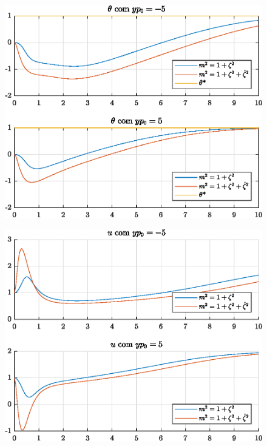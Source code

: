 \begin{figure}[H]
  \centering
  \includegraphics[width=12cm]{figs/theta/yp0-5yp05.eps} 
\end{figure}

\begin{figure}[H]
  \centering
  \includegraphics[width=12cm]{figs/u/yp0-5yp05.eps} 
\end{figure}

